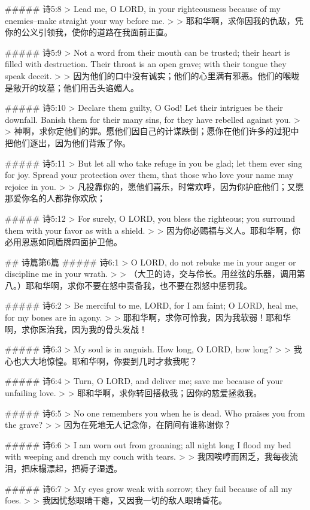 ##### 诗5:8
> Lead me, O LORD, in your righteousness because of my enemies--make straight your way before me.
>
> 耶和华啊，求你因我的仇敌，凭你的公义引领我，使你的道路在我面前正直。


##### 诗5:9
> Not a word from their mouth can be trusted; their heart is filled with destruction. Their throat is an open grave; with their tongue they speak deceit.
>
> 因为他们的口中没有诚实；他们的心里满有邪恶。他们的喉咙是敞开的坟墓；他们用舌头谄媚人。


##### 诗5:10
> Declare them guilty, O God! Let their intrigues be their downfall. Banish them for their many sins, for they have rebelled against you.
>
> 神啊，求你定他们的罪。愿他们因自己的计谋跌倒；愿你在他们许多的过犯中把他们逐出，因为他们背叛了你。


##### 诗5:11
> But let all who take refuge in you be glad; let them ever sing for joy. Spread your protection over them, that those who love your name may rejoice in you.
>
> 凡投靠你的，愿他们喜乐，时常欢呼，因为你护庇他们；又愿那爱你名的人都靠你欢欣；


##### 诗5:12
> For surely, O LORD, you bless the righteous; you surround them with your favor as with a shield.
>
> 因为你必赐福与义人。耶和华啊，你必用恩惠如同盾牌四面护卫他。


## 诗篇第6篇
##### 诗6:1
> O LORD, do not rebuke me in your anger or discipline me in your wrath.
>
> （大卫的诗，交与伶长。用丝弦的乐器，调用第八。）耶和华啊，求你不要在怒中责备我，也不要在烈怒中惩罚我。


##### 诗6:2
> Be merciful to me, LORD, for I am faint; O LORD, heal me, for my bones are in agony.
>
> 耶和华啊，求你可怜我，因为我软弱！耶和华啊，求你医治我，因为我的骨头发战！


##### 诗6:3
> My soul is in anguish. How long, O LORD, how long?
>
> 我心也大大地惊惶。耶和华啊，你要到几时才救我呢？


##### 诗6:4
> Turn, O LORD, and deliver me; save me because of your unfailing love.
>
> 耶和华啊，求你转回搭救我；因你的慈爱拯救我。


##### 诗6:5
> No one remembers you when he is dead. Who praises you from the grave?
>
> 因为在死地无人记念你，在阴间有谁称谢你？


##### 诗6:6
> I am worn out from groaning; all night long I flood my bed with weeping and drench my couch with tears.
>
> 我因唉哼而困乏，我每夜流泪，把床榻漂起，把褥子湿透。


##### 诗6:7
> My eyes grow weak with sorrow; they fail because of all my foes.
>
> 我因忧愁眼睛干瘪，又因我一切的敌人眼睛昏花。



